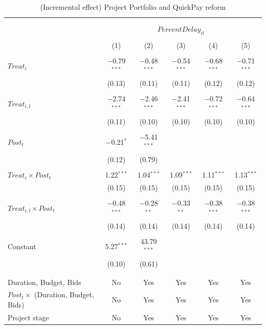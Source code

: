 \documentclass[
]{article}
\begin{document}
\begin{table}[H] \centering 
  \caption{(Incremental effect) Project Portfolio and QuickPay reform} 
  \label{} 
\small 
\begin{tabular}{@{\extracolsep{-2pt}}lccccc} 
\\[-1.8ex]\hline 
\hline \\[-1.8ex] 
\\[-1.8ex] & \multicolumn{5}{c}{$PercentDelay_{it}$  } \\ 
\\[-1.8ex] & (1) & (2) & (3) & (4) & (5)\\ 
\hline \\[-1.8ex] 
 $Treat_i$ & $-$0.79$^{***}$ & $-$0.48$^{***}$ & $-$0.54$^{***}$ & $-$0.68$^{***}$ & $-$0.71$^{***}$ \\ 
  & (0.13) & (0.11) & (0.11) & (0.12) & (0.12) \\ 
  & & & & & \\ 
 $Treat_{i,l}$ & $-$2.74$^{***}$ & $-$2.46$^{***}$ & $-$2.41$^{***}$ & $-$0.72$^{***}$ & $-$0.64$^{***}$ \\ 
  & (0.11) & (0.10) & (0.10) & (0.10) & (0.10) \\ 
  & & & & & \\ 
 $Post_t$ & $-$0.21$^{*}$ & $-$5.41$^{***}$ &  &  &  \\ 
  & (0.12) & (0.79) &  &  &  \\ 
  & & & & & \\ 
 $Treat_i \times Post_t$ & 1.22$^{***}$ & 1.04$^{***}$ & 1.09$^{***}$ & 1.11$^{***}$ & 1.13$^{***}$ \\ 
  & (0.15) & (0.15) & (0.15) & (0.15) & (0.15) \\ 
  & & & & & \\ 
 $Treat_{i,l} \times Post_t$ & $-$0.48$^{***}$ & $-$0.28$^{**}$ & $-$0.33$^{**}$ & $-$0.38$^{***}$ & $-$0.38$^{***}$ \\ 
  & (0.14) & (0.14) & (0.14) & (0.14) & (0.14) \\ 
  & & & & & \\ 
 Constant & 5.27$^{***}$ & 43.79$^{***}$ &  &  &  \\ 
  & (0.10) & (0.61) &  &  &  \\ 
  & & & & & \\ 
\hline \\[-1.8ex] 
Duration, Budget, Bids & No & Yes & Yes & Yes & Yes \\ 
$Post_t \times $  (Duration, Budget, Bids) & No & Yes & Yes & Yes & Yes \\ 
Project stage & No & Yes & Yes & Yes & Yes \\ 

\end{tabular}
\end{table}
\end{document}
